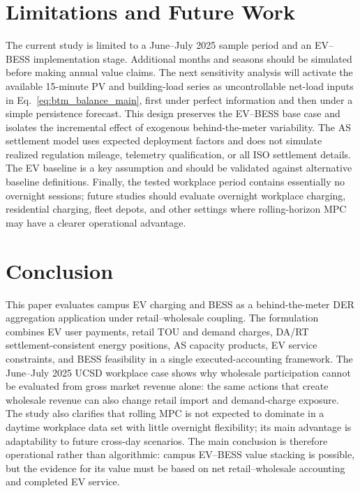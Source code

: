 \documentclass[final,5p,times]{elsarticle}
\begin{document}
\section{Limitations and Future Work}
\label{sec:limitations}

The current study is limited to a June--July 2025 sample period and an EV--BESS implementation stage. Additional months and seasons should be simulated before making annual value claims. The next sensitivity analysis will activate the available 15-minute PV and building-load series as uncontrollable net-load inputs in Eq.~\eqref{eq:btm_balance_main}, first under perfect information and then under a simple persistence forecast. This design preserves the EV--BESS base case and isolates the incremental effect of exogenous behind-the-meter variability. The AS settlement model uses expected deployment factors and does not simulate realized regulation mileage, telemetry qualification, or all ISO settlement details. The EV baseline is a key assumption and should be validated against alternative baseline definitions. Finally, the tested workplace period contains essentially no overnight sessions; future studies should evaluate overnight workplace charging, residential charging, fleet depots, and other settings where rolling-horizon MPC may have a clearer operational advantage.

\section{Conclusion}
\label{sec:conclusion}

This paper evaluates campus EV charging and BESS as a behind-the-meter DER aggregation application under retail--wholesale coupling. The formulation combines EV user payments, retail TOU and demand charges, DA/RT settlement-consistent energy positions, AS capacity products, EV service constraints, and BESS feasibility in a single executed-accounting framework. The June--July 2025 UCSD workplace case shows why wholesale participation cannot be evaluated from gross market revenue alone: the same actions that create wholesale revenue can also change retail import and demand-charge exposure. The study also clarifies that rolling MPC is not expected to dominate in a daytime workplace data set with little overnight flexibility; its main advantage is adaptability to future cross-day scenarios. The main conclusion is therefore operational rather than algorithmic: campus EV--BESS value stacking is possible, but the evidence for its value must be based on net retail--wholesale accounting and completed EV service.
\end{document}
